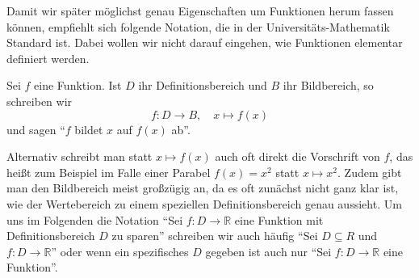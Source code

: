 Damit wir später möglichst genau Eigenschaften um Funktionen herum fassen können, empfiehlt sich folgende Notation, die in der Universitäts-Mathematik Standard ist. Dabei wollen wir nicht darauf eingehen, wie Funktionen elementar definiert werden. 
\begin{definition}
    Sei \(f\) eine Funktion. Ist \(D\) ihr Definitionsbereich und \(B\) ihr Bildbereich, so schreiben wir 
    \begin{equation*}
        f:D \to B, \quad x \mapsto f(x)
    \end{equation*}
    und sagen "`\(f\) bildet \(x\) auf \(f(x)\) ab"'.
\end{definition}
Alternativ schreibt man statt \(x \mapsto f(x)\) auch oft direkt die Vorschrift von \(f\), das heißt zum Beispiel im Falle einer Parabel \(f(x) = x^2\) statt \(x \mapsto x^2\). Zudem gibt man den  Bildbereich meist großzügig an, da es oft zunächst nicht ganz klar ist, wie der Wertebereich zu einem speziellen Definitionsbereich genau aussieht. Um uns im Folgenden die Notation "`Sei \(f:D\to \mathbb R\) eine Funktion mit Definitionsbereich \(D\) zu sparen"' schreiben wir auch häufig "`Sei \(D\subseteq R\) und \(f:D\to\mathbb R\)"' oder wenn ein spezifisches \(D\) gegeben ist auch nur "`Sei \(f:D\to\mathbb R\) eine Funktion"'. 
